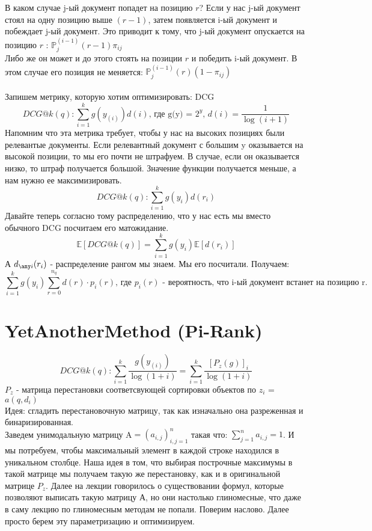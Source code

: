 \documentclass{article}
\begin{document}
В каком случае j-ый документ попадет на позицию $r$? Если у нас j-ый документ стоял на одну позицию выше $(r-1)$, затем появляется i-ый документ и побеждает j-ый документ. Это приводит к тому, что j-ый документ опускается на позицию $r$ : $\mathbb{P}_{j}^{(i-1)}(r-1)\pi_{ij}$ \\
Либо же он может и до этого стоять на позиции $r$ и победить i-ый документ. В этом случае его позиция не меняется: $\mathbb{P}_{j}^{(i-1)}(r)(1-\pi_{ij})$ \\\\

Запишем метрику, которую хотим оптимизировать: DCG\\
$$DCG@k(q): \sum\limits_{i=1}^k{g(y_{(i)})d(i)} \text{, где g(y) = } 2^{y} \text{, } d(i) = \frac{1}{\log(i+1)}$$
Напомним что эта метрика требует, чтобы у нас на высоких позициях были релевантые документы. Если релевантный документ с большим y оказывается на высокой позиции, то мы его почти не штрафуем. В случае, если он оказывается низко, то штраф  получается большой. Значение функции получается меньше, а нам нужно ее максимизировать.
\\ $$DCG@k(q): \sum\limits_{i=1}^k{g(y_{i})d(r_i)}$$ Давайте теперь согласно тому распределению, что у нас есть мы вместо обычного DCG посчитаем его матожидание. \\
$$\mathbb{E}[DCG@k(q)] = \sum\limits_{i=1}^k{}g(y_i)\mathbb{E}[d(r_i)]$$ А $d_{\any i}(r_i)$ - распределение рангом мы знаем. Мы его посчитали. Получаем: $$\sum\limits_{i=1}^k{}g(y_i) \sum\limits_{r=0}^{n_q}{d(r)\cdot p_i(r)} \text{, где $p_i(r)$ - вероятность, что i-ый документ встанет на позицию r.}$$

\section{YetAnotherMethod (Pi-Rank)}

$$DCG@k(q): \sum\limits_{i=1}^k{\frac{g(y_{(i)})}{\log(1+i)}} = 
\sum\limits_{i=1}^k{\frac{[P_z (g) ]_i}{\log(1+i)}} $$ $P_z$ - матрица перестановки соответсвующей сортировки объектов по $z_i$ = $a(q, d_i)$ \\
Идея: сгладить перестановочную матрицу, так как изначально она разреженная и бинаризированная.\\

Заведем унимодальную матрицу  A$ = (a_{i,j})_{i,j=1}^n$ такая что: $ \sum\limits_{j=1}^n{a_{i,j}}=1$. И мы потребуем, чтобы максимальный элемент в каждой строке находился в уникальном столбце. Наша идея в том, что выбирая построчные максимумы в такой матрице мы получаем такую же перестановку, как и в оригинальной матрице $P_z$. Далее на лекции говорилось о существовании формул, которые позволяют выписать такую матрицу А, но они настолько глиномесные, что даже в саму лекцию по глиномесным методам не попали. Поверим наслово. Далее просто берем эту параметризацию и оптимизируем. 
\end{document}
